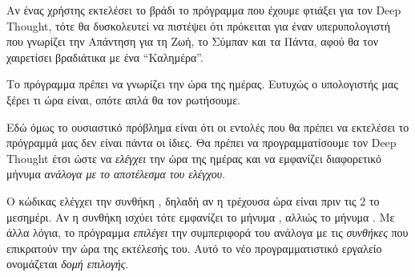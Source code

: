 \documentclass[a4paper,11pt,oneside]{book}
\begin{document}
\begin{question}
Αν ένας χρήστης εκτελέσει το βράδι το πρόγραμμα που έχουμε φτιάξει για τον Deep Thought, τότε θα δυσκολευτεί να πιστέψει ότι πρόκειται για έναν υπερυπολογιστή που γνωρίζει την Απάντηση για τη Ζωή, το Σύμπαν και τα Πάντα, αφού θα τον χαιρετίσει βραδιάτικα με ένα ``Καλημέρα''. 
\end{question}

Tο πρόγραμμα πρέπει να γνωρίζει την ώρα της ημέρας. Ευτυχώς ο υπολογιστής μας ξέρει τι ώρα είναι, οπότε απλά θα τον ρωτήσουμε.


Εδώ όμως το ουσιαστικό πρόβλημα είναι ότι οι εντολές που θα πρέπει να εκτελέσει το πρόγραμμά μας δεν είναι πάντα οι ίδιες.  Θα πρέπει να προγραμματίσουμε τον Deep Thought έτσι ώστε να \emph{ελέγχει} την ώρα της ημέρας και να εμφανίζει διαφορετικό μήνυμα \emph{ανάλογα με το αποτέλεσμα του ελέγχου}. 


Ο κώδικας ελέγχει την συνθήκη , δηλαδή αν η τρέχουσα ώρα είναι πριν τις 2 το μεσημέρι. Αν η συνθήκη ισχύει τότε εμφανίζει το μήνυμα , αλλιώς το μήνυμα . Με άλλα λόγια, το πρόγραμμα \emph{επιλέγει} την συμπεριφορά του ανάλογα με τις \emph{συνθήκες} που επικρατούν την ώρα της εκτέλεσής του. Αυτό το νέο προγραμματιστικό εργαλείο ονομάζεται \emph{δομή επιλογής}.
\end{document}
